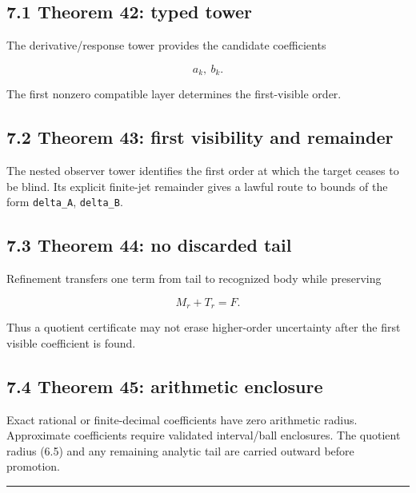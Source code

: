 \hypertarget{theorem-42-typed-tower}{%
\subsection{7.1 Theorem 42: typed tower}\label{theorem-42-typed-tower}}

The derivative/response tower provides the candidate coefficients

\[
a_k,\ b_k.
\]

The first nonzero compatible layer determines the first-visible order.

\hypertarget{theorem-43-first-visibility-and-remainder}{%
\subsection{7.2 Theorem 43: first visibility and remainder}\label{theorem-43-first-visibility-and-remainder}}

The nested observer tower identifies the first order at which the target ceases
to be blind. Its explicit finite-jet remainder gives a lawful route to bounds
of the form \texttt{delta\_A}, \texttt{delta\_B}.

\hypertarget{theorem-44-no-discarded-tail}{%
\subsection{7.3 Theorem 44: no discarded tail}\label{theorem-44-no-discarded-tail}}

Refinement transfers one term from tail to recognized body while preserving

\[
M_r+T_r=F.
\]

Thus a quotient certificate may not erase higher-order uncertainty after the
first visible coefficient is found.

\hypertarget{theorem-45-arithmetic-enclosure}{%
\subsection{7.4 Theorem 45: arithmetic enclosure}\label{theorem-45-arithmetic-enclosure}}

Exact rational or finite-decimal coefficients have zero arithmetic radius.
Approximate coefficients require validated interval/ball enclosures. The
quotient radius (6.5) and any remaining analytic tail are carried outward before
promotion.

\begin{center}\rule{0.5\linewidth}{0.5pt}\end{center}

